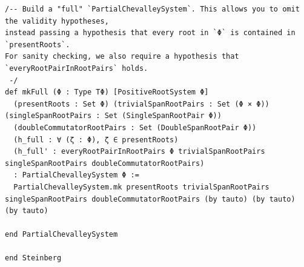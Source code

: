 \begin{Verbatim}
/-- Build a "full" `PartialChevalleySystem`. This allows you to omit the validity hypotheses,
instead passing a hypothesis that every root in `Φ` is contained in `presentRoots`.
For sanity checking, we also require a hypothesis that `everyRootPairInRootPairs` holds.
 -/
def mkFull (Φ : Type TΦ) [PositiveRootSystem Φ]
  (presentRoots : Set Φ) (trivialSpanRootPairs : Set (Φ × Φ)) (singleSpanRootPairs : Set (SingleSpanRootPair Φ))
  (doubleCommutatorRootPairs : Set (DoubleSpanRootPair Φ))
  (h_full : ∀ (ζ : Φ), ζ ∈ presentRoots)
  (h_full' : everyRootPairInRootPairs Φ trivialSpanRootPairs singleSpanRootPairs doubleCommutatorRootPairs)
  : PartialChevalleySystem Φ :=
  PartialChevalleySystem.mk presentRoots trivialSpanRootPairs singleSpanRootPairs doubleCommutatorRootPairs (by tauto) (by tauto) (by tauto)

end PartialChevalleySystem

end Steinberg
\end{Verbatim}
